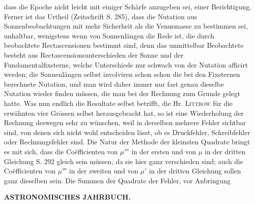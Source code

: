 dass die Epoche nicht leicht mit einiger Schärfe anzugeben sei, einer Berichtigung. Ferner ist das Urtheil (Zeitschrift S. 285), dass die Nutation aus Sonnenbeobachtungen mit mehr Sicherheit als die Venusmasse zu bestimmen sei, unhaltbar, wenigstens wenn von Sonnenlängen die Rede ist, die durch beobachtete Rectascensionen bestimmt sind, denn das unmittelbar Beobachtete besteht aus Rectascensionsunterschieden der Sonne und der Fundamentalfixsterne, welche Unterschiede nur schwach von der Nutation afficirt werden; die Sonnenlängen selbst involviren schon schon die bei den Fixsternen berechnete Nutation, und man wird daher immer nur fast genau dieselbe Nutation wieder finden müssen, die man bei der Rechnung zum Grunde gelegt hatte. Was nun endlich die Resultate selbst betrifft, die Hr. \textsc{Littrow} für die erwähnten vier Grössen selbst herausgebracht hat, so ist eine Wiederholung der Rechnung deswegen sehr zu wünschen, weil in derselben mehrere Fehler sichtbar sind, von denen sich nicht wohl entscheiden lässt, ob es Druckfehler, Schreibfehler oder Rechnungsfehler sind. Die Natur der Methode der kleinsten Quadrate bringt es mit sich, dass die Coëfficienten von $\mu'''$ in der ersten und von $\mu$ in der dritten Gleichung S. 292 gleich sein müssen, da sie hier ganz verschieden sind; auch die Coëfficienten von $\mu'''$ in der zweiten und von $\mu'$ in der dritten Gleichung sollen ganz dieselben sein. Die Summen der Quadrate der Fehler, vor Anbringung\par
\clearpage
\thispagestyle{empty}
\noindent{}%
\makebox[12mm][l]{}%
\parbox[t]{\dimexpr\linewidth-24mm\relax}{\centering\footnotesize\bfseries ASTRONOMISCHES JAHRBUCH.\par}%
\par\medskip
